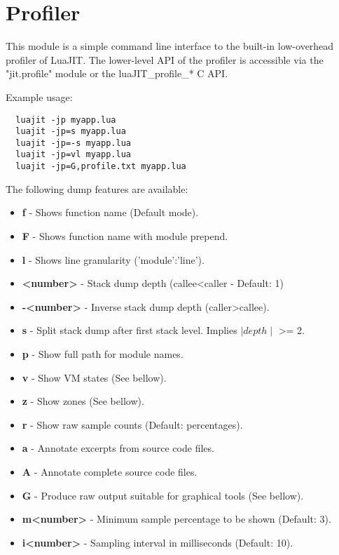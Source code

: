 \section{Profiler}
\label{Sec:Profiler}

This module is a simple command line interface to the built-in
low-overhead profiler of LuaJIT. The lower-level API of the profiler
is accessible via the "jit.profile" module or the luaJIT\_profile\_* C API.

Example usage:
\begin{lstlisting}
  luajit -jp myapp.lua
  luajit -jp=s myapp.lua
  luajit -jp=-s myapp.lua
  luajit -jp=vl myapp.lua
  luajit -jp=G,profile.txt myapp.lua
\end{lstlisting}
The following dump features are available:
 \begin{itemize}%
  \item \textbf{f} - Shows function name (Default mode).
  \item \textbf{F} - Shows function name with module prepend.
  \item \textbf{l} - Shows line granularity ('module':'line').
  \item \textbf{\textless number\textgreater} - Stack dump depth (callee\textless caller - Default: 1)
  \item \textbf{-\textless number\textgreater} - Inverse stack dump depth (caller\textgreater callee).
  \item \textbf{s} - Split stack dump after first stack level. Implies $\mid depth\mid$
  \textgreater= 2.
  \item \textbf{p} - Show full path for module names.
  \item \textbf{v} - Show VM states (See bellow).
  \item \textbf{z} - Show zones (See bellow).
  \item \textbf{r} - Show raw sample counts (Default: percentages).
  \item \textbf{a} - Annotate excerpts from source code files.
  \item \textbf{A} - Annotate complete source code files.
  \item \textbf{G} - Produce raw output suitable for graphical tools (See bellow).
  \item \textbf{m\textless number\textgreater} - Minimum sample percentage to be shown (Default: 3).
  \item \textbf{i\textless number\textgreater} - Sampling interval in milliseconds (Default: 10).
 \end{itemize}

